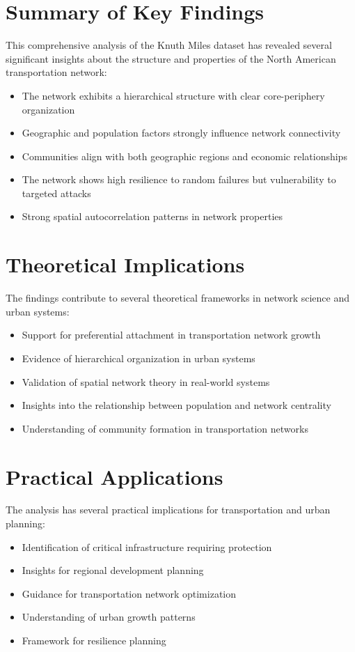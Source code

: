 \section{Summary of Key Findings}
This comprehensive analysis of the Knuth Miles dataset has revealed several significant insights about the structure and properties of the North American transportation network:

\begin{itemize}
    \item The network exhibits a hierarchical structure with clear core-periphery organization
    \item Geographic and population factors strongly influence network connectivity
    \item Communities align with both geographic regions and economic relationships
    \item The network shows high resilience to random failures but vulnerability to targeted attacks
    \item Strong spatial autocorrelation patterns in network properties
\end{itemize}

\section{Theoretical Implications}
The findings contribute to several theoretical frameworks in network science and urban systems:

\begin{itemize}
    \item Support for preferential attachment in transportation network growth
    \item Evidence of hierarchical organization in urban systems
    \item Validation of spatial network theory in real-world systems
    \item Insights into the relationship between population and network centrality
    \item Understanding of community formation in transportation networks
\end{itemize}

\section{Practical Applications}
The analysis has several practical implications for transportation and urban planning:

\begin{itemize}
    \item Identification of critical infrastructure requiring protection
    \item Insights for regional development planning
    \item Guidance for transportation network optimization
    \item Understanding of urban growth patterns
    \item Framework for resilience planning
\end{itemize}

